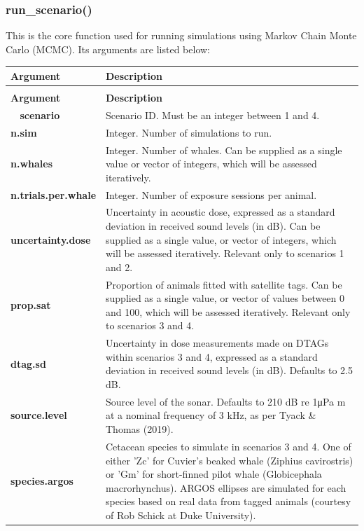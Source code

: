 \documentclass[
]{article}
\begin{document}
\subsubsection{run\_scenario()}

This is the core function used for running simulations using Markov Chain Monte Carlo (MCMC). Its arguments are listed below:

\renewcommand{\arraystretch}{1.4}

\begin{longtable}{>{\bfseries}l|>{\raggedright\arraybackslash}p{30em}}
\toprule
\textbf{Argument} & \textbf{Description}\\
\midrule
\endfirsthead
\multicolumn{2}{@{}l}{\textit{(continued)}}\\
\toprule
\textbf{Argument} & \textbf{Description}\\
\midrule
\endhead
\
\endfoot
\bottomrule
\endlastfoot
scenario & Scenario ID. Must be an integer between 1 and 4.\\
n.sim & Integer. Number of simulations to run.\\
n.whales & Integer. Number of whales. Can be supplied as a single value or vector of integers, which will be assessed iteratively.\\
n.trials.per.whale & Integer. Number of exposure sessions per animal.\\
uncertainty.dose & Uncertainty in acoustic dose, expressed as a standard deviation in received sound levels (in dB). Can be supplied as a single value, or vector of integers, which will be assessed iteratively. Relevant only to scenarios 1 and 2.\\
\addlinespace
prop.sat & Proportion of animals fitted with satellite tags. Can be supplied as a single value, or vector of values between 0 and 100, which will be assessed iteratively. Relevant only to scenarios 3 and 4.\\
dtag.sd & Uncertainty in dose measurements made on DTAGs within scenarios 3 and 4, expressed as a standard deviation in received sound levels (in dB). Defaults to 2.5 dB.\\
source.level & Source level of the sonar. Defaults to 210 dB re 1μPa m at a nominal frequency of 3 kHz, as per Tyack \& Thomas (2019).\\
species.argos & Cetacean species to simulate in scenarios 3 and 4. One of either 'Zc' for Cuvier's beaked whale (Ziphius cavirostris) or 'Gm' for short-finned pilot whale (Globicephala macrorhynchus). ARGOS ellipses are simulated for each species based on real data from tagged animals (courtesy of Rob Schick at Duke University).\\

\end{longtable}
\end{document}
